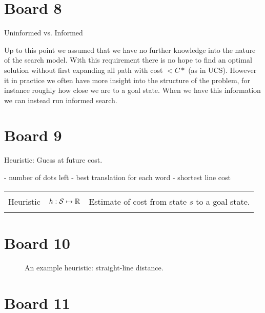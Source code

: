 \documentclass[10pt]{article}
\def\Graph{\path node(A)[draw, initial, state] at (-2, 1) {A};
    \path node(B)[draw, state] at (-1, 3) {B};
    \path node(C)[draw, state, accepting] at (4, 2) {C};
    \path node(D)[draw, state] at (1, 1) {D};
    \path node(E)[draw, state] at (2, 3) {E};
    \path[draw] (A) --node[xshift=-0.2cm]{2} (B); 
    \path[draw] (B) --node[yshift=0.2cm]{4} (E); 
    \path[draw] (A) --node[yshift=0.2cm]{3} (D); 
    \path[draw] (A) --node[yshift=0.2cm]{5} (E); 
    \path[draw] (D) --node[yshift=0.2cm]{4} (C); 
    \path[draw] (E) --node[yshift=0.2cm]{4} (C); 
}
\begin{document}
\section{Board 8}

Uninformed vs. Informed



Up to this point we assumed that we have no further knowledge into the
nature of the search model. With this requirement there is no hope to
find an optimal solution without first expanding all path with cost $<
C*$ (as in UCS).  However it in practice we often have more insight
into the structure of the problem, for instance roughly how close we 
are to a goal state. When we have this information we can instead run 
informed search.


\section{Board 9}

Heuristic: Guess at future cost.

- number of dots left
- best translation for each word
- shortest line cost
\begin{center}
\begin{tabularx}{\linewidth}{llX}
  \toprule \\
 Heuristic & $h: \mathcal{S} \mapsto \mathbb{R}$ & Estimate of cost from state $s$ to a goal state. \\\\
\bottomrule
\end{tabularx}
\end{center}


\section{Board 10}


\begin{figure}
  \centering


 
  \caption{\label{fig:heu} An example heuristic: straight-line distance.}
\end{figure}

\section{Board 11}
\end{document}
